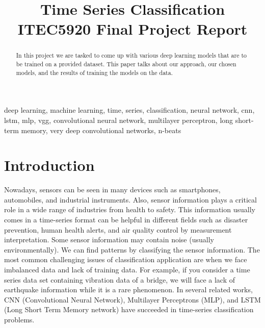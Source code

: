 \documentclass[conference]{IEEEtran}
\begin{document}
\title{Time Series Classification \\ ITEC5920 Final Project Report}

\author{
\and
{}

}

\maketitle

\begin{abstract}
In this project we are tasked to come up with various deep learning models that are to be trained on a provided dataset. This paper talks about our approach, our chosen models, and the results of training the models on the data.
\end{abstract}

\begin{IEEEkeywords}
deep learning, machine learning, time, series, classification, neural network, cnn, lstm, mlp, vgg, convolutional neural network, multilayer perceptron, long short-term memory, very deep convolutional networks, n-beats
\end{IEEEkeywords}

\section{Introduction}
Nowadays, sensors can be seen in many devices such as smartphones, automobiles, and industrial instruments. Also, sensor information plays a critical role in a wide range of industries from health to safety. This information usually comes in a time-series format can be helpful in different fields such as disaster prevention, human health alerts, and air quality control by measurement interpretation. Some sensor information may contain noise (usually environmentally). We can find patterns by classifying the sensor information. The most common challenging issues of classification application are when we face imbalanced data and lack of training data. For example, if you consider a time series data set containing vibration data of a bridge, we will face a lack of earthquake information while it is a rare phenomenon. In several related works, CNN (Convolutional Neural Network), Multilayer Perceptrons (MLP), and LSTM (Long Short Term Memory network) have succeeded in time-series classification problems.
\end{document}
